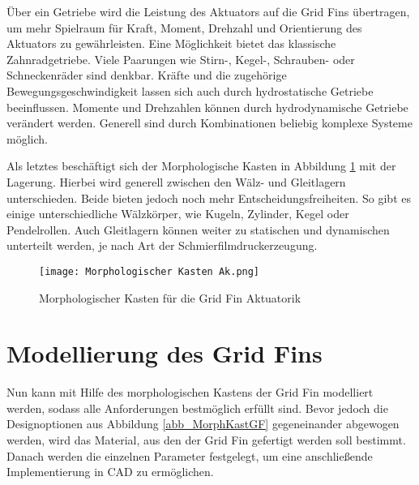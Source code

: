 Über ein Getriebe wird die Leistung des Aktuators auf die Grid Fins übertragen, um mehr Spielraum für Kraft, Moment, Drehzahl und Orientierung des Aktuators zu gewährleisten. Eine Möglichkeit bietet das klassische Zahnradgetriebe. Viele Paarungen wie Stirn-, Kegel-, Schrauben- oder Schneckenräder sind denkbar. Kräfte und die zugehörige Bewegungsgeschwindigkeit lassen sich auch durch hydrostatische Getriebe beeinflussen. Momente und Drehzahlen können durch hydrodynamische Getriebe verändert werden. Generell sind durch Kombinationen beliebig komplexe Systeme möglich.

Als letztes beschäftigt sich der Morphologische Kasten in Abbildung \ref{abb_MorphKastAk} mit der Lagerung. Hierbei wird generell zwischen den Wälz- und Gleitlagern unterschieden. Beide bieten jedoch noch mehr Entscheidungsfreiheiten. So gibt es einige unterschiedliche Wälzkörper, wie Kugeln, Zylinder, Kegel oder Pendelrollen. Auch Gleitlagern können weiter zu statischen und dynamischen unterteilt werden, je nach Art der Schmierfilmdruckerzeugung.
\begin{figure}[h]
	\centering
	\texttt{[image: Morphologischer Kasten Ak.png]}
	\caption{Morphologischer Kasten für die Grid Fin Aktuatorik}
	\label{abb_MorphKastAk}
\end{figure}
\section{Modellierung des Grid Fins}
Nun kann mit Hilfe des morphologischen Kastens der Grid Fin modelliert werden, sodass alle Anforderungen bestmöglich erfüllt sind. Bevor jedoch die Designoptionen aus Abbildung \ref{abb_MorphKastGF} gegeneinander abgewogen werden, wird das Material, aus den der Grid Fin gefertigt werden soll bestimmt. Danach werden die einzelnen Parameter festgelegt, um eine anschließende Implementierung in CAD zu ermöglichen.
